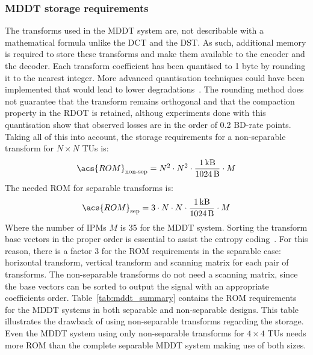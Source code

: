 \documentclass[11pt,a4paper,openright,twoside]{book}
\numberwithin{equation}{section} %
\numberwithin{figure}{section} %
\numberwithin{table}{section} %
\begin{document}
\subsubsection{\acs{MDDT} storage requirements}
\label{ssub:mddt_storage_requirements}

The transforms used in the \ac{MDDT} system are, not describable with a
mathematical formula unlike the \ac{DCT} and the \ac{DST}.
As such, additional memory is required to store these transforms and make them
available to the encoder and the decoder.
Each transform coefficient has been quantised to 1 byte by rounding it to the
nearest integer.
More advanced quantisation techniques could have been implemented that would
lead to lower degradations~\cite{britanak-06-dct-and-dst}.
The rounding method does not guarantee that the transform remains orthogonal
and that the compaction property in the \ac{RDOT} is retained, althoug
experiments done with this quantisation show that observed losses are in the
order of 0.2 \ac{BD}-rate points.
Taking all of this into account, the storage requirements for a non-separable
transform for $N\times N$ \acp{TU} is:
\begin{equation}
	\acs{ROM}_{\text{non-sep}} =
	N^2 \cdot N^2 \cdot \frac{\SI{1}{\kilo B}}{\SI{1024}{B}} \cdot M
	\label{eqn:rom_nsep}
\end{equation}
The needed \acs{ROM} for separable transforms is:
\begin{equation}
	\acs{ROM}_{\text{sep}} =
	3 \cdot N \cdot N \cdot \frac{\SI{1}{\kilo B}}{\SI{1024}{B}} \cdot M
	\label{eqn:rom_sep}
\end{equation}
Where the number of \acp{IPM} $M$ is 35 for the \ac{MDDT} system.
Sorting the transform base vectors in the proper order is essential to assist
the entropy coding~\cite{ye-08-intra-directional-scanning-mddt}.
For this reason, there is a factor 3 for the \acs{ROM} requirements in the
separable case: horizontal transform, vertical transform and scanning matrix
for each pair of transforms.
The non-separable transforms do not need a scanning matrix, since the base
vectors can be sorted to output the signal with an appropriate coefficients
order.
Table~\ref{tab:mddt_summary} contains the \acs{ROM} requirements for the
\ac{MDDT} systems in both separable and non-separable designs.
This table illustrates the drawback of using non-separable transforms
regarding the storage.
Even the \ac{MDDT} system using only non-separable transforms for $4\times4$
\acp{TU} needs more \acs{ROM} than the complete separable \ac{MDDT} system
making use of both sizes.
\end{document}
